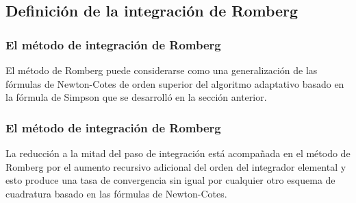 \subsection{Definición de la integración de Romberg}
\begin{frame}
\frametitle{El método de integración de Romberg}
El método de Romberg puede considerarse como una generalización de las fórmulas de Newton-Cotes de orden superior del algoritmo adaptativo basado en la fórmula de Simpson que se desarrolló en la sección anterior.
\end{frame}
\begin{frame}
\frametitle{El método de integración de Romberg}
La reducción a la mitad del paso de integración está acompañada en el método de Romberg por el aumento recursivo adicional del orden del integrador elemental y esto produce una tasa de convergencia sin igual por cualquier otro esquema de cuadratura basado en las fórmulas de Newton-Cotes.
\end{frame}
